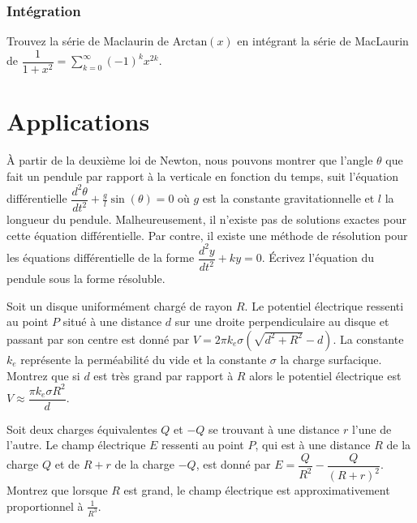 \documentclass[]{book}
\theoremstyle{definition}
\theoremstyle{definition}
\theoremstyle{definition}
\theoremstyle{remark}
\let\BeginKnitrBlock\begin \let\EndKnitrBlock\end
\begin{document}
\hypertarget{integration}{%
\subsubsection{Intégration}\label{integration}}

\BeginKnitrBlock{example}
\protect\hypertarget{exm:unnamed-chunk-32}{}{\label{exm:unnamed-chunk-32}
}Trouvez la série de Maclaurin de \(\text{Arctan}(x)\) en intégrant la
série de MacLaurin de
\(\dfrac{1}{1+x^2}=\sum_{k=0}^{\infty}(-1)^kx^{2k}\).
\EndKnitrBlock{example}
\vspace*{10cm}

\hypertarget{applications}{%
\section{Applications}\label{applications}}

\BeginKnitrBlock{example}
\protect\hypertarget{exm:unnamed-chunk-33}{}{\label{exm:unnamed-chunk-33} }À
partir de la deuxième loi de Newton, nous pouvons montrer que l'angle
\(\theta\) que fait un pendule par rapport à la verticale en fonction du
temps, suit l'équation différentielle
\(\dfrac{d^2\theta}{dt^2}+\frac{g}{l}\sin(\theta)=0\) où \(g\) est la
constante gravitationnelle et \(l\) la longueur du pendule.
Malheureusement, il n'existe pas de solutions exactes pour cette
équation différentielle. Par contre, il existe une méthode de résolution
pour les équations différentielle de la forme
\(\dfrac{d^2y}{dt^2}+ky=0\). Écrivez l'équation du pendule sous la forme
résoluble.
\EndKnitrBlock{example}
\vspace*{10cm}

\BeginKnitrBlock{example}
\protect\hypertarget{exm:unnamed-chunk-34}{}{\label{exm:unnamed-chunk-34}
}Soit un disque uniformément chargé de rayon \(R\). Le potentiel
électrique ressenti au point \(P\) situé à une distance \(d\) sur une
droite perpendiculaire au disque et passant par son centre est donné par
\(V=2\pi k_e \sigma (\sqrt{d^2+R^2}-d)\). La constante \(k_e\)
représente la perméabilité du vide et la constante \(\sigma\) la charge
surfacique. Montrez que si \(d\) est très grand par rapport à \(R\)
alors le potentiel électrique est
\(V \approx \dfrac{\pi k_e \sigma R^2}{d}\).
\EndKnitrBlock{example}
\vspace*{10cm}

\BeginKnitrBlock{example}
\protect\hypertarget{exm:unnamed-chunk-35}{}{\label{exm:unnamed-chunk-35}
}Soit deux charges équivalentes \(Q\) et \(-Q\) se trouvant à une
distance \(r\) l'une de l'autre. Le champ électrique \(E\) ressenti au
point \(P\), qui est à une distance \(R\) de la charge \(Q\) et de
\(R+r\) de la charge \(-Q\), est donné par
\(E=\dfrac{Q}{R^2}-\dfrac{Q}{(R+r)^2}\). Montrez que lorsque \(R\) est
grand, le champ électrique est approximativement proportionnel à
\(\frac{1}{R^3}\).
\EndKnitrBlock{example}
\vspace*{10cm}
\end{document}

